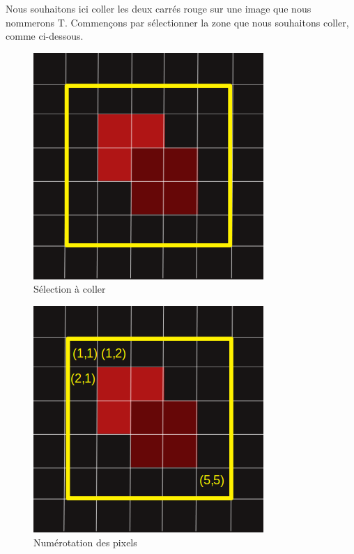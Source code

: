 Nous souhaitons ici coller les deux carrés rouge sur une image que nous nommerons T. Commençons par sélectionner la zone que nous souhaitons coller, comme ci-dessous. 
\begin{figure}[!h]
\centering
\includegraphics[scale=0.3]{Images/carre_selection.png}
\caption{Sélection à coller}
\end{figure}

\begin{figure}[!h]
\centering
\includegraphics[scale=0.3]{Images/numerote.png}
\caption{Numérotation des pixels}
\end{figure}


